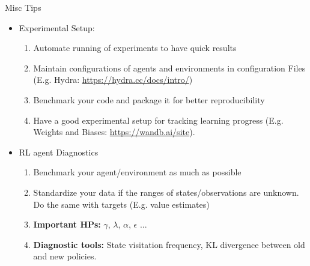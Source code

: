 \documentclass[aspectratio=169]{../latex_main/tntbeamer}  %
\begin{document}
\begin{frame}[c]{Misc Tips}

    \begin{itemize}   
        \item Experimental Setup:
            \begin{enumerate}
                \item Automate running of experiments to have quick results 
                \item Maintain configurations of agents and environments in configuration Files (E.g. Hydra: \url{https://hydra.cc/docs/intro/})
                \item Benchmark your code and package it for better reproducibility
                \item Have a good experimental setup for tracking learning progress (E.g. Weights and Biases: \url{https://wandb.ai/site}). 
            \end{enumerate}
        \item RL agent Diagnostics
            \begin{enumerate}
                \item Benchmark your agent/environment as much as possible
                \item Standardize your data if the ranges of states/observations are unknown. Do the same with targets (E.g. value estimates)
                \item \textbf{Important HPs:} $\gamma$, $\lambda$, $\alpha$, $\epsilon$ ... 
                \item \textbf{Diagnostic tools:} State visitation frequency, KL divergence between old and new policies. 
            \end{enumerate}
        
    \end{itemize}

\end{frame}
\end{document}
